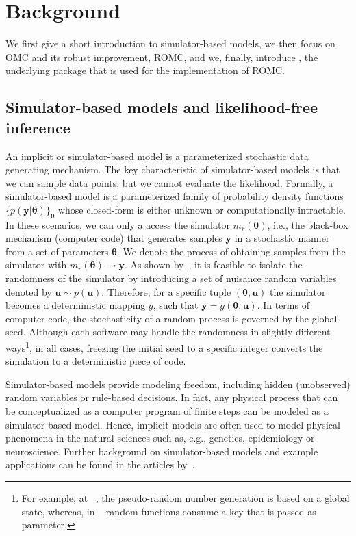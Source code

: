 \documentclass[article]{jss}
\newcommand{\ub}{\mathbf{u}}
\newcommand{\yb}{\mathbf{y}}
\newcommand{\thetab}{\boldsymbol{\theta}}
\newcommand{\simulator}{g}
\begin{document}
\section{Background}

We first give a short introduction to simulator-based models, we then
focus on OMC and its robust improvement, ROMC, and we, finally,
introduce , the underlying package that is used for the
implementation of ROMC.

\subsection{Simulator-based models and likelihood-free inference}

An implicit or simulator-based model is a parameterized stochastic
data generating mechanism. The key characteristic of simulator-based
models is that we can sample data points, but we cannot evaluate the
likelihood. Formally, a simulator-based model is a parameterized
family of probability density functions
\(\{ p(\yb|\thetab)\}_{\thetab}\) whose closed-form is either unknown
or computationally intractable. In these scenarios, we can only a
access the simulator \( m_r(\thetab) \), i.e., the black-box mechanism
(computer code) that generates samples \(\yb\) in a stochastic manner
from a set of parameters \(\thetab\). We denote the process of
obtaining samples from the simulator with
\( m_r(\thetab) \rightarrow \yb \). As shown by~\citet{Meeds2015}, it
is feasible to isolate the randomness of the simulator by introducing
a set of nuisance random variables denoted by \(\ub \sim
p(\ub)\). Therefore, for a specific tuple \((\thetab, \ub)\) the
simulator becomes a deterministic mapping \(g\), such that
\(\yb=\simulator(\thetab,\ub)\). In terms of computer code, the
stochasticity of a random process is governed by the global
seed. Although each software may handle the randomness in slightly
different ways\footnote{For example, at
  ~\citet{harris2020array}, the pseudo-random number
  generation is based on a global state, whereas, in
  ~\citet{jax2018github} random functions consume a key that
  is passed as parameter. }, in all cases, freezing the initial seed
to a specific integer converts the simulation to a deterministic piece
of code.

Simulator-based models provide modeling freedom, including hidden
(unobserved) random variables or rule-based decisions. In fact, any
physical process that can be conceptualized as a computer program of
finite steps can be modeled as a simulator-based model. Hence,
implicit models are often used to model physical phenomena in the
natural sciences such as, e.g., genetics, epidemiology or
neuroscience. Further background on simulator-based models and example
applications can be found in the articles by~\citet{gutmann2016,
  lintusaari2017, sisson2018, cranmer2020}.
\end{document}
